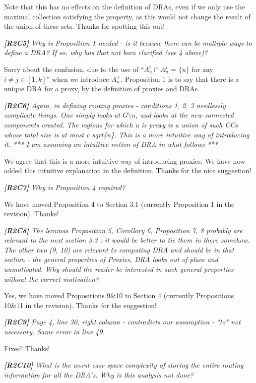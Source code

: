\documentclass[11pt]{letter}
\newcommand{\vs}{\vspace{1ex}}
\newcommand{\svs}{\vspace{0.36ex}}
\begin{document}
Note that this has no effects on the definition of DRAs, even if we only use the maximal collection satisfying the property, as this would not change the result of the union of these sets. Thanks for spotting this out!

\vs
\noindent
{\em{\bf[R2C5]} Why is Proposition 1 needed - is it because there can be multiple ways to define a DRA? If so, why has that not been clarified (see 4 above)?}
\svs

Sorry about the confusion, due to the use of ``$A^i_u\cap A^j_u$ = $\{u\}$ for any $i\ne j\in[1, k]$'' when we introduce $A_u^+$.
 Proposition 1 is to say that there is a unique DRA for a proxy, by the definition of proxies and DRAs.


\vs
\noindent
{\em{\bf[R2C6]} Again, in defining routing proxies - conditions 1, 2, 3 needlessly
complicate things. One simply looks at $G \setminus u$, and looks at the
new connected components created. The regions for which u is proxy
is a union of such CCs whose total size is at most c sqrt\{n\}. This
is a more intuitive way of introducing it.
*** I am assuming an intuitive notion of DRA in what follows ***
}
\svs

We agree that this is a more intuitive way of introducing proxies.  We have now added this intuitive explanation in the definition. Thanks for the nice suggestion!



\vs
\noindent
{\em{\bf[R2C7]} Why is Proposition 4 required?}
\svs

We have moved Proposition 4 to Section 3.1 (currently Proposition 1 in the revision). Thanks!

\vs
\noindent
{\em{\bf[R2C8]} The lemmas Proposition 5, Corollary 6, Proposition 7, 8 probably
are relevant to the next section 3.3 : it would be better to tie them
in there somehow. The other two (9, 10) are relevant to computing DRA
and should be in that section - the general properties of Proxies, DRA
looks out of place and unmotivated. Why should the reader be
interested
in such general properties without the correct motivation?
}

\svs
Yes, we have moved Propositions 9\&10 to Section 4 (currently Propositions 10\&11 in the revision). Thanks for the suggestion!

\vs
\noindent
{\em{\bf[R2C9]} Page 4, line 30, right column - contradicts our assumption - "to" not necessary. Same error in line 49.}
\svs

Fixed! Thanks!

\vs
\noindent
{\em{\bf[R2C10]} What is the worst case space complexity of storing the entire routing information for all the DRA's. Why is this analysis not done?}
\svs
\end{document}
